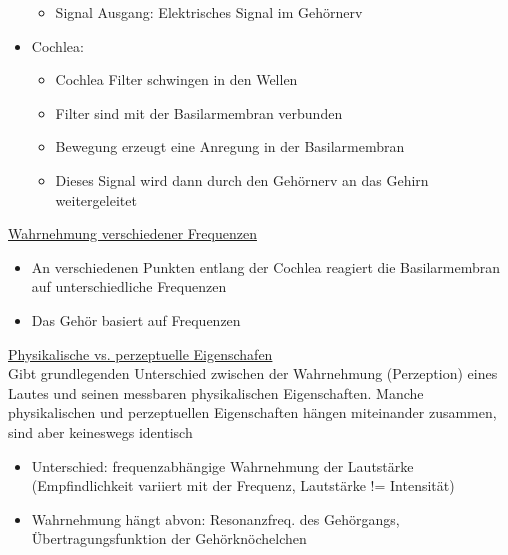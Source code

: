 \documentclass[a4paper,10pt,oneside]{article}
\begin{document}
\begin{itemize}
\begin{itemize}
				\item Signal Ausgang: Elektrisches Signal im Gehörnerv
			\end{itemize}
		\item Cochlea:
			\begin{itemize}
				\item Cochlea Filter schwingen in den Wellen
				\item Filter sind mit der Basilarmembran verbunden
				\item Bewegung erzeugt eine Anregung in der Basilarmembran
				\item Dieses Signal wird dann durch den Gehörnerv an das Gehirn weitergeleitet
			\end{itemize}
	\end{itemize}

\underline{Wahrnehmung verschiedener Frequenzen} \\
	\begin{itemize}
		\item An verschiedenen Punkten entlang der Cochlea reagiert die Basilarmembran auf unterschiedliche Frequenzen
		\item Das Gehör basiert auf Frequenzen
	\end{itemize}

\underline{Physikalische vs. perzeptuelle Eigenschafen} \\
Gibt grundlegenden Unterschied zwischen der Wahrnehmung (Perzeption) eines Lautes und seinen messbaren physikalischen Eigenschaften. Manche physikalischen und perzeptuellen Eigenschaften hängen miteinander zusammen, sind aber keineswegs identisch
	\begin{itemize}
		\item Unterschied: frequenzabhängige Wahrnehmung der Lautstärke (Empfindlichkeit variiert mit der Frequenz, Lautstärke != Intensität)
		\item Wahrnehmung hängt abvon: Resonanzfreq. des Gehörgangs, Übertragungsfunktion der Gehörknöchelchen
	\end{itemize}
 		
 		
 		
 		
 		
 		
 		
 		
 		
 		
 		
 		
 		
 		
 		
 		
 		
 		
 		
 	

 
\end{document}
